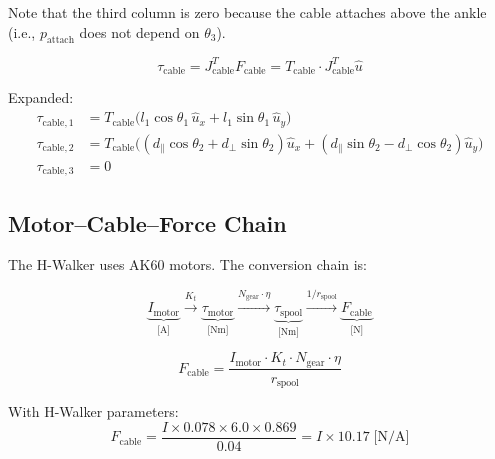 \documentclass[11pt,a4paper]{article}
\newcommand{\vc}[1]{\bm{#1}}
\def\vc#1{#1}%
\def\bm#1{#1}%
\begin{document}
Note that the third column is zero because the cable attaches above the ankle
(i.e., $\vc{p}_{\text{attach}}$ does not depend on $\theta_3$).

\begin{resultbox}
\begin{equation}
    \vc{\tau}_{\text{cable}} = \vc{J}_{\text{cable}}^T \vc{F}_{\text{cable}}
    = T_{\text{cable}} \cdot \vc{J}_{\text{cable}}^T \hat{\vc{u}}
    \label{eq:cable_torque_mapping}
\end{equation}

Expanded:
\begin{align}
    \tau_{\text{cable},1} &= T_{\text{cable}} \bigl(
        l_1 \cos\theta_1 \, \hat{u}_x + l_1 \sin\theta_1 \, \hat{u}_y
    \bigr) \\
    \tau_{\text{cable},2} &= T_{\text{cable}} \bigl(
        (d_{\parallel}\cos\theta_2 + d_{\perp}\sin\theta_2)\hat{u}_x
        + (d_{\parallel}\sin\theta_2 - d_{\perp}\cos\theta_2)\hat{u}_y
    \bigr) \\
    \tau_{\text{cable},3} &= 0
\end{align}
\end{resultbox}

\subsection{Motor--Cable--Force Chain}

The H-Walker uses AK60 motors. The conversion chain is:

\begin{equation}
    \underbrace{I_{\text{motor}}}_{\text{[A]}}
    \xrightarrow{K_t}
    \underbrace{\tau_{\text{motor}}}_{\text{[Nm]}}
    \xrightarrow{N_{\text{gear}} \cdot \eta}
    \underbrace{\tau_{\text{spool}}}_{\text{[Nm]}}
    \xrightarrow{1/r_{\text{spool}}}
    \underbrace{F_{\text{cable}}}_{\text{[N]}}
\end{equation}

\begin{equation}
\boxed{
    F_{\text{cable}} = \frac{I_{\text{motor}} \cdot K_t \cdot N_{\text{gear}} \cdot \eta}{r_{\text{spool}}}
}
\label{eq:motor_to_force}
\end{equation}

With H-Walker parameters:
\begin{equation}
    F_{\text{cable}} = \frac{I \times 0.078 \times 6.0 \times 0.869}{0.04}
                     = I \times 10.17 \;\text{[N/A]}
\end{equation}
\end{document}
